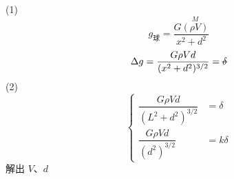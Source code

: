 (1)
\[ \boxed{\,g_{\text{球}}=\dfrac{G\overset{M}{(\rho V)}}{x^{2}+d^{2}}\,} \]
\[ \Delta g=\dfrac{G\rho Vd}{(x^{2}+d^{2})^{3/2}}= \text{\struck{$\delta$}} \]
(2)
\[ \left\{\begin{aligned} \dfrac{G\rho Vd}{(L^{2}+d^{2})^{3/2}}&=\delta\\[4pt] \dfrac{G\rho Vd}{(d^{2})^{3/2}}&=k\delta \end{aligned}\right. \]
解出 $V$、$d$
